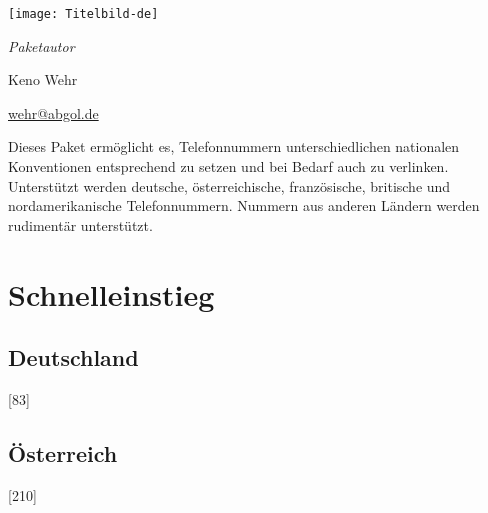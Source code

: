 \documentclass[numbers=noenddot]{scrreprt}
\begin{document}
\begin{titlepage}
\begin{center}
\texttt{[image: Titelbild-de]}

\vfill
\Large
\textit{Paketautor}

\medskip
Keno Wehr

\large
\smallskip
\url{wehr@abgol.de}
\end{center}

\vfill
\noindent Dieses Paket ermöglicht es, Telefonnummern unterschiedlichen nationalen Konventionen entsprechend zu setzen und bei Bedarf auch zu verlinken. Unterstützt werden deutsche, österreichische, französische, britische und nordamerikanische Telefonnummern. Nummern aus anderen Ländern werden rudimentär unterstützt.
\end{titlepage}

\tableofcontents


\chapter{Schnelleinstieg}
\section{Deutschland}
\begin{sidebyside}
  [83]
\end{sidebyside}
\begin{sidebyside}
\end{sidebyside}
\begin{sidebyside}
\end{sidebyside}
\begin{sidebyside}
\end{sidebyside}

\section{Österreich}
\begin{sidebyside}
  [210]
\end{sidebyside}

\begin{sidebyside}
\end{sidebyside}
\end{document}
